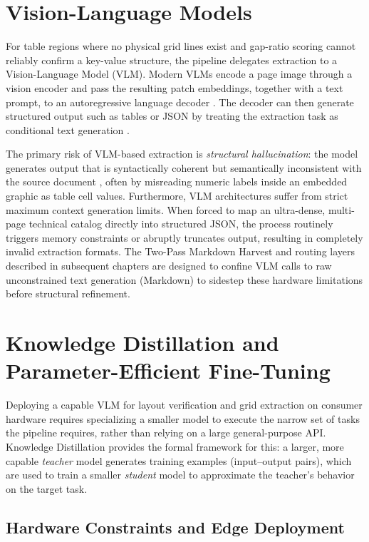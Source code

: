 \section{Vision-Language Models}
\label{sec:vlms}

For table regions where no physical grid lines exist and gap-ratio scoring cannot reliably confirm a key-value structure, the pipeline delegates extraction to a Vision-Language Model (VLM). Modern VLMs encode a page image through a vision encoder and pass the resulting patch embeddings, together with a text prompt, to an autoregressive language decoder \citep{qwen_vl, gpt4v}. The decoder can then generate structured output such as tables or JSON by treating the extraction task as conditional text generation \citep{json_mode}.

The primary risk of VLM-based extraction is \textit{structural hallucination}: the model generates output that is syntactically coherent but semantically inconsistent with the source document \citep{docvqa}, often by misreading numeric labels inside an embedded graphic as table cell values. Furthermore, VLM architectures suffer from strict maximum context generation limits. When forced to map an ultra-dense, multi-page technical catalog directly into structured JSON, the process routinely triggers memory constraints or abruptly truncates output, resulting in completely invalid extraction formats. The Two-Pass Markdown Harvest and routing layers described in subsequent chapters are designed to confine VLM calls to raw unconstrained text generation (Markdown) to sidestep these hardware limitations before structural refinement.

\section{Knowledge Distillation and Parameter-Efficient Fine-Tuning}
\label{sec:peft}

Deploying a capable VLM for layout verification and grid extraction on consumer hardware requires specializing a smaller model to execute the narrow set of tasks the pipeline requires, rather than relying on a large general-purpose API. Knowledge Distillation \citep{knowledge_distill} provides the formal framework for this: a larger, more capable \textit{teacher} model generates training examples (input--output pairs), which are used to train a smaller \textit{student} model to approximate the teacher's behavior on the target task.

\subsection{Hardware Constraints and Edge Deployment}
\label{subsec:hardware_constraints}

